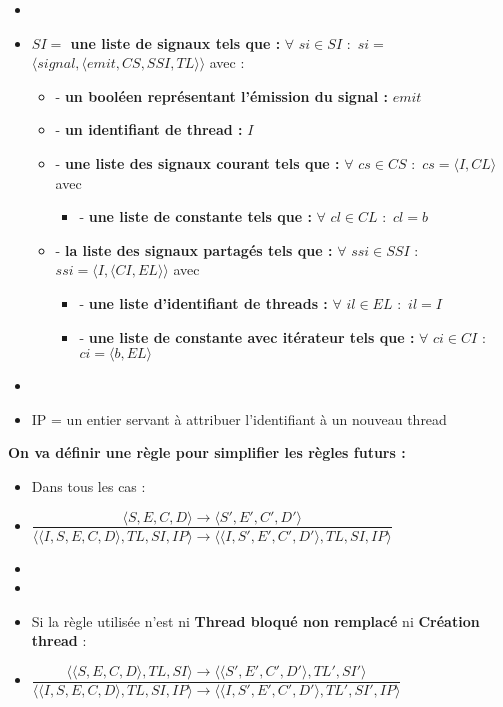 \documentclass[10pt,a4paper]{article}
\begin{document}
\begin{itemize}
					\item[]
					\item[] \textbf{$SI =$ une liste de signaux tels que :} $\forall$ $si \in SI$ $:$ $si =$ $\langle signal,\langle emit,CS,SSI,TL\rangle\rangle$ avec :
					\begin{itemize}
						\item[] - \textbf{un booléen représentant l'émission du signal :} $emit$
						\item[] - \textbf{un identifiant de thread :} $I$
						\item[] - \textbf{une liste des signaux courant tels que :} $\forall$ $cs \in CS$ $:$ $cs = \langle I,CL\rangle$ avec 
						\begin{itemize}
							\item[] - \textbf{une liste de constante tels que :} $\forall$ $cl \in CL$ $:$ $cl = b$
						\end{itemize}
					
						\item[] - \textbf{la liste des signaux partagés tels que :} $\forall$ $ssi \in SSI$ $:$ $ssi = \langle I,\langle CI,EL\rangle\rangle$ avec 
						\begin{itemize}
							\item[] - \textbf{une liste d'identifiant de threads :} $\forall$ $il \in EL$ $:$ $il = I$
							\item[] - \textbf{une liste de constante avec itérateur tels que :} $\forall$ $ci \in CI$ $:$ $ci = \langle b, EL\rangle$
						\end{itemize}
					\end{itemize}
					\item[]
					\item[] IP = un entier servant à attribuer l'identifiant à un nouveau thread 
				\end{itemize}
				\bigbreak
				
				\textbf{On va définir une règle pour simplifier les règles futurs :} 
				\begin{itemize}
					\item[] Dans tous les cas :
					\item[] \begin{center}
								$\dfrac{\langle S,E,C,D\rangle \rightarrow \langle S',E',C',D'\rangle}{\langle\langle I,S,E,C,D\rangle,TL,SI,IP\rangle \rightarrow \langle\langle I,S',E',C',D'\rangle,TL,SI,IP\rangle}$
							\end{center}
					\item[]
					\item[]
					\item[] Si la règle utilisée n'est ni \textbf{Thread bloqué non remplacé} ni \textbf{Création thread} :
					\smallbreak 
					\item[] \begin{center}
								$\dfrac{\langle\langle S,E,C,D\rangle,TL,SI\rangle \rightarrow \langle\langle S',E',C',D'\rangle,TL',SI'\rangle}{\langle\langle I,S,E,C,D\rangle,TL,SI,IP\rangle \rightarrow \langle\langle I,S',E',C',D'\rangle,TL',SI',IP\rangle}$ 
							\end{center}
				\end{itemize}
				\newpage
				
\end{document}

